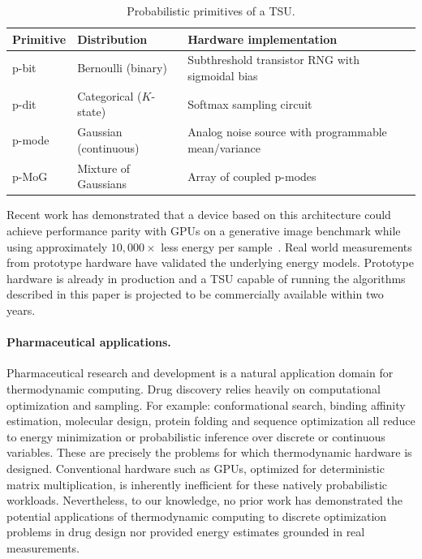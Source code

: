\documentclass[11pt,twocolumn]{article}
\begin{document}
\begin{table}[h]
\centering
\caption{Probabilistic primitives of a TSU.}
\label{tab:tsu-primitives}
\vspace{2mm}
\begin{tabular}{lll}
\toprule
Primitive & Distribution & Hardware implementation \\
\midrule
p-bit & Bernoulli (binary) & Subthreshold transistor RNG with sigmoidal bias \\
p-dit & Categorical ($K$-state) & Softmax sampling circuit \\
p-mode & Gaussian (continuous) & Analog noise source with programmable mean/variance \\
p-MoG & Mixture of Gaussians & Array of coupled p-modes \\
\bottomrule
\end{tabular}
\end{table}
Recent work has demonstrated that a device based on this architecture could achieve performance parity with GPUs on a generative image benchmark while using approximately $10{,}000\times$ less energy per sample~\cite{jelincic2025dtm}. Real world measurements from prototype hardware have validated the underlying energy models.
Prototype hardware is already in production and a TSU capable of running the algorithms described in this paper is projected to be commercially available within two years.

\paragraph{Pharmaceutical applications.}
Pharmaceutical research and development is a natural application domain for thermodynamic computing.
Drug discovery relies heavily on computational optimization and sampling. For example: conformational search, binding affinity estimation, molecular design, protein folding and sequence optimization all reduce to energy minimization or probabilistic inference over discrete or continuous variables. These are precisely the problems for which thermodynamic hardware is designed.
Conventional hardware such as GPUs, optimized for deterministic matrix multiplication, is inherently inefficient for these natively probabilistic workloads. Nevertheless, to our knowledge, no prior work has demonstrated the potential applications of thermodynamic computing to discrete optimization problems in drug design nor provided energy estimates grounded in real measurements.
\end{document}
